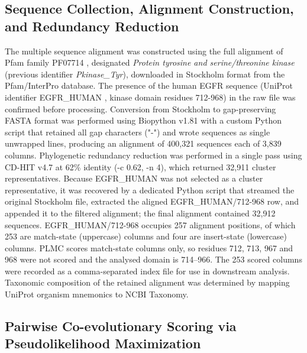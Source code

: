 \documentclass[utf8]{FrontiersinHarvard}
\begin{document}
\subsection{Sequence Collection, Alignment Construction, and Redundancy Reduction}

The multiple sequence alignment was constructed using the full alignment of Pfam family PF07714 \citep{Punta2012,Pfam2021,InterPro2023}, designated \emph{Protein tyrosine and serine/threonine kinase} (previous identifier \emph{Pkinase\_Tyr}), downloaded in Stockholm format from the Pfam/InterPro database. The presence of the human EGFR sequence (UniProt identifier EGFR\_HUMAN \citep{UniProt2023}, kinase domain residues 712-968) in the raw file was confirmed before processing. Conversion from Stockholm to gap-preserving FASTA format was performed using Biopython v1.81 \citep{Cock2009} with a custom Python script that retained all gap characters ("-") and wrote sequences as single unwrapped lines, producing an alignment of 400,321 sequences each of 3,839 columns. Phylogenetic redundancy reduction was performed in a single pass using CD-HIT v4.7 \citep{LiGodzik2006,Fu2012} at 62\% identity (-c 0.62, -n 4), which returned 32,911 cluster representatives. Because EGFR\_HUMAN was not selected as a cluster representative, it was recovered by a dedicated Python script that streamed the original Stockholm file, extracted the aligned EGFR\_HUMAN/712-968 row, and appended it to the filtered alignment; the final alignment contained 32,912 sequences. EGFR\_HUMAN/712-968 occupies 257 alignment positions, of which 253 are match-state (uppercase) columns and four are insert-state (lowercase) columns. PLMC scores match-state columns only, so residues 712, 713, 967 and 968 were not scored and the analysed domain is 714--966. The 253 scored columns were recorded as a comma-separated index file for use in downstream analysis. Taxonomic composition of the retained alignment was determined by mapping UniProt organism mnemonics to NCBI Taxonomy.

\subsection{Pairwise Co-evolutionary Scoring via Pseudolikelihood Maximization}
\end{document}
